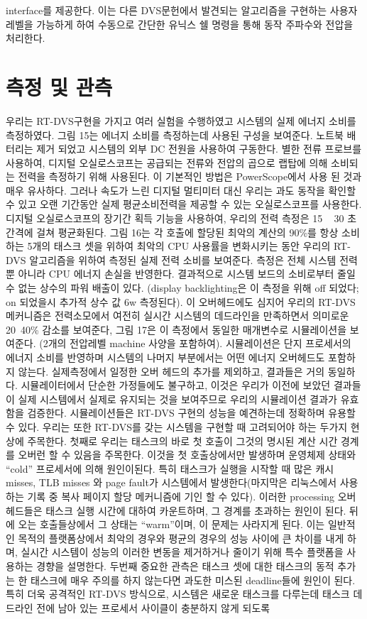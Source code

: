 \documentclass[11pt
  , a4paper
  , article
  , oneside
]{memoir}
\begin{document}
interface를 제공한다. 이는 다른 DVS문헌에서 발견되는 알고리즘을 구현하는 사용자 레벨을 가능하게 하여 수동으로 간단한 유닉스 쉘 명령을 통해 동작 주파수와 전압을 처리한다.

\section{측정 및 관측}
우리는 RT-DVS구현을 가지고 여러 실험을 수행하였고 시스템의 실제 에너지 소비를 측정하였다. 그림 15는 에너지 소비를 측정하는데 사용된 구성을 보여준다. 노트북 배터리는 제거 되었고 시스템의 외부 DC 전원을 사용하여 구동한다. 별한 전류 프로브를 사용하여, 디지털 오실로스코프는 공급되는 전류와 전압의 곱으로 랩탑에 의해 소비되는 전력을 측정하기 위해 사용된다.
이 기본적인 방법은 PowerScope에서 사용 된 것과 매우 유사하다. 그러나 속도가 느린 디지털 멀티미터 대신 우리는 과도 동작을 확인할 수 있고 오랜 기간동안 실제 평균소비전력을 제공할 수 있는 오실로스코프를 사용한다. 디지털 오실로스코프의 장기간 획득 기능을 사용하여, 우리의 전력 측정은 15 ~ 30 초 간격에 걸쳐 평균화된다. 그림 16는 각 호출에 할당된 최악의 계산의 90\%를 항상 소비하는 5개의 태스크 셋을 위하여 최악의 CPU 사용률을 변화시키는 동안 우리의 RT-DVS 알고리즘을 위하여 측정된 실제 전력 소비를 보여준다. 측정은 전체 시스템 전력뿐 아니라 CPU 에너지 손실을 반영한다. 결과적으로 시스템 보드의 소비로부터 줄일 수 없는 상수의 파워 배출이 있다. (display backlighting은 이 측정을 위해 off 되었다; on 되었을시 추가적 상수 값 6w 측정된다). 이 오버헤드에도 심지어 우리의 RT-DVS 메커니즘은 전력소모에서 여전히 실시간 시스템의 데드라인을 만족하면서 의미로운 20~40\% 감소를 보여준다, 그림 17은 이 측정에서 동일한 매개변수로 시뮬레이션을 보여준다. (2개의 전압레벨 machine 사양을 포함하여). 시뮬레이션은 단지 프로세서의 에너지 소비를 반영하며 시스템의 나머지 부분에서는 어떤 에너지 오버헤드도 포함하지 않는다. 실제측정에서 일정한 오버 헤드의 추가를 제외하고, 결과들은 거의 동일하다. 시뮬레이터에서 단순한 가정들에도 불구하고, 이것은 우리가 이전에 보았던 결과들이 실제 시스템에서 실제로 유지되는 것을 보여주므로 우리의 시뮬레이션 결과가 유효함을 검증한다. 시뮬레이션들은 RT-DVS 구현의 성능을 예견하는데 정확하며 유용할 수 있다. 우리는 또한 RT-DVS를 갖는 시스템을 구현할 때 고려되어야 하는 두가지 현상에 주목한다. 첫째로 우리는 태스크의 바로 첫 호출이 그것의 명시된 계산 시간 경계를 오버런 할 수 있음을 주목한다. 이것을 첫 호출상에서만 발생하며 운영체제 상태와 “cold” 프로세서에 의해 원인이된다. 특히 태스크가 실행을 시작할 때 많은 캐시 misses, TLB misses 와 page fault가 시스템에서 발생한다(마지막은 리눅스에서 사용하는 기록 중 복사 페이지 할당 메커니즘에 기인 할 수 있다). 이러한 processing 오버헤드들은 태스크 실행 시간에 대하여 카운트하며, 그 경계를 초과하는 원인이 된다. 뒤에 오는 호출들상에서 그 상태는 “warm”이며, 이 문제는 사라지게 된다. 이는 일반적인 목적의 플랫폼상에서 최악의 경우와 평균의 경우의 성능 사이에 큰 차이를 내게 하며, 실시간 시스템이 성능의 이러한 변동을 제거하거나 줄이기 위해 특수 플랫폼을 사용하는 경향을 설명한다. 두번째 중요한 관측은 태스크 셋에 대한 태스크의 동적 추가는 한 태스크에 매우 주의를 하지 않는다면 과도한 미스된 deadline들에 원인이 된다. 특히 더욱 공격적인 RT-DVS 방식으로, 시스템은 새로운 태스크를 다루는데 태스크 데드라인 전에 남아 있는 프로세서 사이클이 충분하지 않게 되도록 
\end{document}
